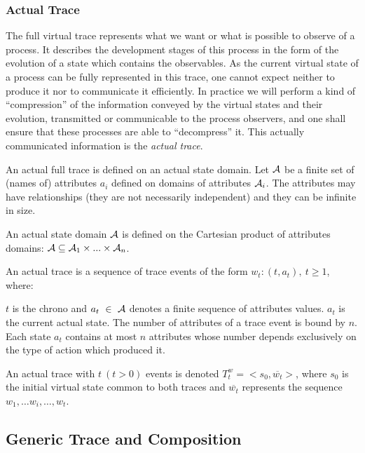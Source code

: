 \subsubsection{Actual Trace}

The full virtual trace represents what we want or what is possible to observe of a process. It describes the development stages of this process in the form of the evolution of a state which contains the observables. As the current virtual state of a process can be fully represented in this trace, one cannot expect neither to produce it nor to communicate it efficiently. In practice we will perform a kind of ``compression'' of the information conveyed by the virtual states and their evolution, transmitted or communicable to the process observers, and one shall ensure that these processes are able to ``decompress'' it. This actually communicated information is the {\em actual trace}.

An actual full trace is defined on an actual state domain. Let ${\cal A}$ be a finite set of (names of) attributes $a_i$ defined on domains of attributes ${\cal A}_i$.
The attributes may have relationships (they are not necessarily independent) and they can be infinite in size.

An actual state domain ${\cal A}$ is defined on the Cartesian product of attributes domains: ${\cal A} \subseteq {\cal A}_{1}\times ...\times {\cal A}_{n}$. 

\begin{definition} 

An actual trace is a sequence of trace events of the form {\bf $w_t: (t, a_t),\ t \geq 1$}, where:

\noindent
$t$ is the chrono and $a_t\ \in\ {\cal A}$ denotes a finite sequence of attributes values. $a_t$ is the current actual state. The number of attributes of a trace event is bound by $ n $. Each state $a_t$ contains at most $n$ attributes whose number depends exclusively on the type of action which produced it.
\end{definition}
An actual trace with $t\ (t > 0)$  events is denoted $T^w_t = <s_0, \overline{w_t}>$, where $s_0$ is the initial virtual state common to both traces and $\overline{w_t}$  represents the sequence $w_1, \ldots w_i, \ldots, w_t $.




\subsection{Generic Trace and Composition}

